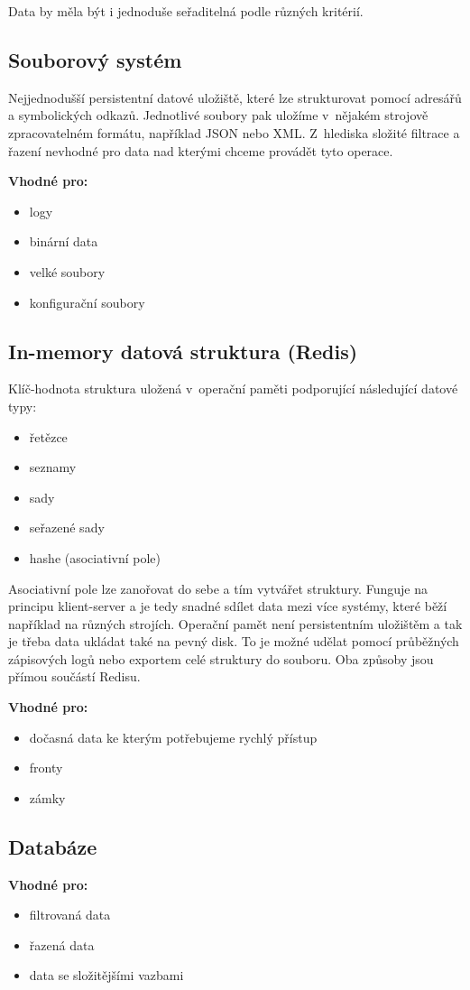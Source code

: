 Data by měla být i jednoduše seřaditelná podle různých kritérií.

\subsection{Souborový systém}

Nejjednodušší persistentní datové uložiště, které lze strukturovat pomocí adresářů a symbolických odkazů.
Jednotlivé soubory pak uložíme v~nějakém strojově zpracovatelném formátu, například JSON nebo XML.
Z~hlediska složité filtrace a řazení nevhodné pro data nad kterými chceme provádět tyto operace.

\textbf{Vhodné pro:}
\begin{itemize}
	\item logy
	\item binární data
	\item velké soubory
	\item konfigurační soubory
\end{itemize}

\subsection{In-memory datová struktura (Redis)}

Klíč-hodnota struktura uložená v~operační paměti podporující následující datové typy:

\begin{itemize}
	\item řetězce
	\item seznamy
	\item sady
	\item seřazené sady
	\item hashe (asociativní pole)
\end{itemize}

Asociativní pole lze zanořovat do sebe a tím vytvářet struktury.
Funguje na principu klient-server a je tedy snadné sdílet data mezi více systémy, které běží například na různých strojích.
Operační pamět není persistentním uložištěm a tak je třeba data ukládat také na pevný disk.
To je možné udělat pomocí průběžných zápisových logů nebo exportem celé struktury do souboru.
Oba způsoby jsou přímou součástí Redisu.

\medskip\noindent
\textbf{Vhodné pro:}
\begin{itemize}
	\item dočasná data ke kterým potřebujeme rychlý přístup
	\item fronty
	\item zámky
\end{itemize}

\subsection{Databáze}

\medskip\noindent
\textbf{Vhodné pro:}
\begin{itemize}
	\item filtrovaná data
	\item řazená data
	\item data se složitějšími vazbami
\end{itemize}

